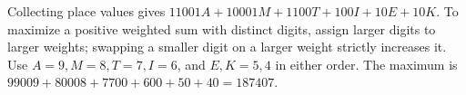 Collecting place values gives $11001A+10001M+1100T+100I+10E+10K$. To maximize a positive weighted sum with distinct digits, assign larger digits to larger weights; swapping a smaller digit on a larger weight strictly increases it. Use $A=9,M=8,T=7,I=6$, and $E,K=5,4$ in either order. The maximum is $99009+80008+7700+600+50+40=\boxed{187407}$.
